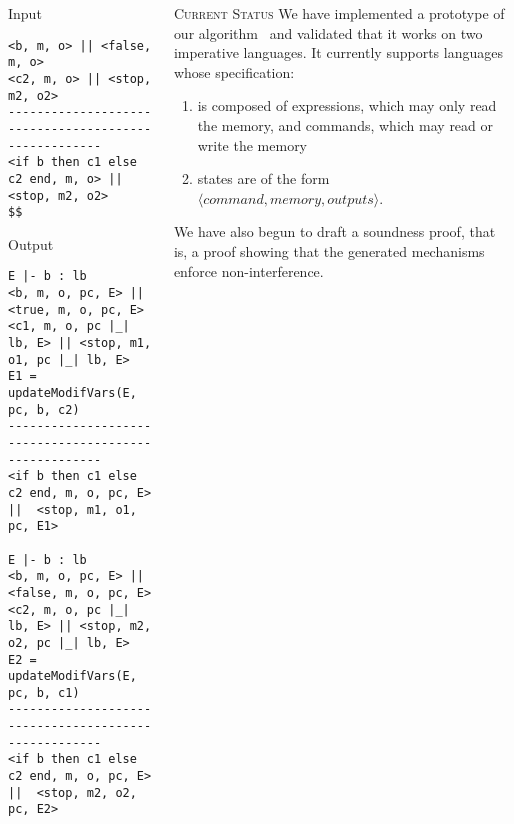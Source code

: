 \documentclass[final]{beamer}
\newlength{\onecolwid}
\newlength{\twocolwid}
\begin{document}
\begin{frame}[fragile]
\begin{columns}[t]
\begin{column}{\twocolwid}
\begin{minipage}[t]{0.49\linewidth}
\begin{alertblock}{Input}
\begin{lstlisting}
<b, m, o> || <false, m, o>
<c2, m, o> || <stop, m2, o2>
-----------------------------------------------------
<if b then c1 else c2 end, m, o> || <stop, m2, o2>
$$
\end{lstlisting}        
\end{alertblock}
\end{minipage}
\hfill%
\begin{minipage}[t]{0.49\linewidth}
\begin{alertblock}{Output}
\begin{lstlisting}
E |- b : lb
<b, m, o, pc, E> || <true, m, o, pc, E>
<c1, m, o, pc |_| lb, E> || <stop, m1, o1, pc |_| lb, E>
E1 = updateModifVars(E, pc, b, c2)
-----------------------------------------------------
<if b then c1 else c2 end, m, o, pc, E> ||  <stop, m1, o1, pc, E1>

E |- b : lb
<b, m, o, pc, E> || <false, m, o, pc, E>
<c2, m, o, pc |_| lb, E> || <stop, m2, o2, pc |_| lb, E>
E2 = updateModifVars(E, pc, b, c1)
-----------------------------------------------------
<if b then c1 else c2 end, m, o, pc, E> ||  <stop, m2, o2, pc, E2>
\end{lstlisting}
\end{alertblock}
\end{minipage}
\end{column}

\begin{column}{\onecolwid}

\begin{block}{\textsc{Current Status}}
We have implemented a prototype of our algorithm~\cite{GitHub:ott-ifc} and validated that it works on two imperative languages. It currently supports languages whose specification: 
\begin{enumerate}
\item is composed of expressions, which may only read the memory, and commands, which may read or write the memory
\item states are of the form $\langle command, memory, outputs\rangle$. 
\end{enumerate}

We have also begun to draft a soundness proof, that is, a proof showing that the generated mechanisms enforce non-interference.


\end{block}


\end{column}
\end{columns}
\end{frame}
\end{document}
